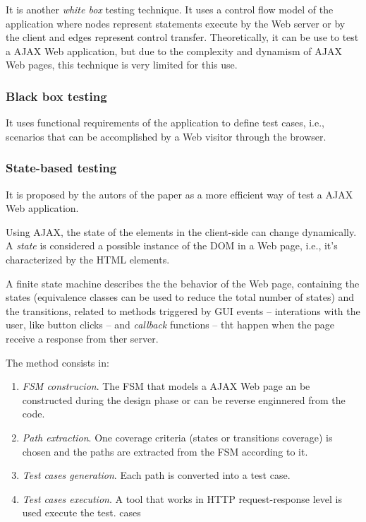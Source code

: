 \documentclass[a4paper]{article}
\begin{document}
It is another \emph{white box} testing technique. 
It uses a control flow model of the application where nodes represent statements execute by the Web server or by the client and edges represent control transfer.
Theoretically, it can be use to test a AJAX Web application, but due to the complexity and dynamism of AJAX Web pages, this technique is very limited for this use.

\subsubsection{Black box testing} 

It uses functional requirements of the application to define test cases, i.e., scenarios that can be accomplished by a Web visitor through the browser.

\subsubsection{State-based testing}

It is proposed by the autors of the paper as a more efficient way of test a AJAX Web application.

Using AJAX, the state of the elements in the client-side can change dynamically.
A \emph{state} is considered a possible instance of the DOM in a Web page, i.e., it's characterized by the HTML elements.

A finite state machine describes the the behavior of the Web page, containing the states (equivalence classes can be used to reduce the total number of states) and the transitions, related to methods triggered by GUI events -- interations with the user, like button clicks -- and \emph{callback} functions -- tht happen when the page receive a response from ther server.

The method consists in: 

\begin{enumerate}
\item \emph{FSM construcion}. The FSM that models a AJAX Web page an be constructed during the design phase or can be reverse enginnered from the code.
\item \emph{Path extraction}. One coverage criteria (states or transitions coverage) is chosen and the paths are extracted from the FSM according to it.
\item \emph{Test cases generation}. Each path is converted into a test case.
\item \emph{Test cases execution}. A tool that works in HTTP request-response level is used execute the test. cases
\end{enumerate}
\end{document}
